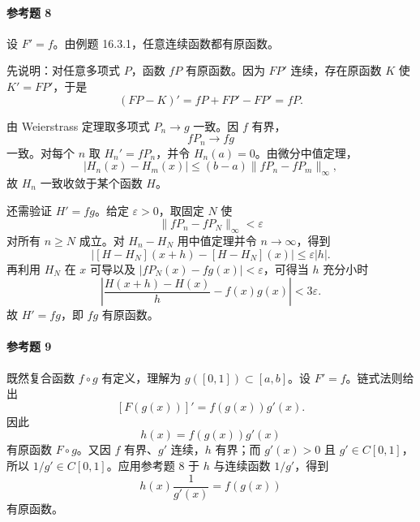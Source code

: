 \paragraph{参考题 8}
\begin{xsolution}
设 $F'=f$。由例题 16.3.1，任意连续函数都有原函数。

先说明：对任意多项式 $P$，函数 $fP$ 有原函数。因为 $FP'$ 连续，存在原函数 $K$ 使 $K'=FP'$，于是
\[
  (FP-K)'=fP+FP'-FP'=fP.
\]

由 Weierstrass 定理取多项式 $P_n\to g$ 一致。因 $f$ 有界，
\[
  fP_n\to fg
\]
一致。对每个 $n$ 取 $H_n'=fP_n$，并令 $H_n(a)=0$。由微分中值定理，
\[
  |H_n(x)-H_m(x)|\leqslant(b-a)\|fP_n-fP_m\|_\infty,
\]
故 $H_n$ 一致收敛于某个函数 $H$。

还需验证 $H'=fg$。给定 $\varepsilon>0$，取固定 $N$ 使
\[
  \|fP_n-fP_N\|_\infty<\varepsilon
\]
对所有 $n\geqslant N$ 成立。对 $H_n-H_N$ 用中值定理并令 $n\to\infty$，得到
\[
  |[H-H_N](x+h)-[H-H_N](x)|\leqslant\varepsilon|h|.
\]
再利用 $H_N$ 在 $x$ 可导以及 $|fP_N(x)-fg(x)|<\varepsilon$，可得当 $h$ 充分小时
\[
  \left|\frac{H(x+h)-H(x)}h-f(x)g(x)\right|<3\varepsilon.
\]
故 $H'=fg$，即 $fg$ 有原函数。
\end{xsolution}

\paragraph{参考题 9}
\begin{xsolution}
既然复合函数 $f\circ g$ 有定义，理解为 $g([0,1])\subset[a,b]$。设 $F'=f$。链式法则给出
\[
  [F(g(x))]'=f(g(x))g'(x).
\]
因此
\[
  h(x)=f(g(x))g'(x)
\]
有原函数 $F\circ g$。又因 $f$ 有界、$g'$ 连续，$h$ 有界；而 $g'(x)>0$ 且 $g'\in C[0,1]$，所以 $1/g'\in C[0,1]$。应用参考题 8 于 $h$ 与连续函数 $1/g'$，得到
\[
  h(x)\frac1{g'(x)}=f(g(x))
\]
有原函数。
\end{xsolution}

